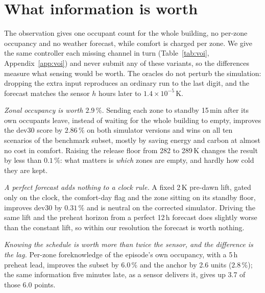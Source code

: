 \providecommand{\pending}[1]{\textcolor{red}{[pending: #1]}}
\providecommand{\e}[1]{\times10^{-#1}}

\section{What information is worth}
\label{sec:voi}

The observation gives one occupant count for the whole building, no per-zone occupancy and no
weather forecast, while comfort is charged per zone. We give the same controller each missing
channel in turn (Table~\ref{tab:voi}, Appendix~\ref{app:voi}) and never submit any of these
variants, so the differences measure what sensing would be worth. The oracles do not perturb
the simulation: dropping the extra input reproduces an ordinary run to the last digit, and the
forecast matches the sensor $h$ hours later to $1.4\e{5}$\,K.

\emph{Zonal occupancy is worth $2.9\,\%$.} Sending each zone to standby 15\,min after its own
occupants leave, instead of waiting for the whole building to empty, improves the dev30 score by
$2.86\,\%$ on both simulator versions and wins on all ten scenarios of the benchmark subset,
mostly by saving energy and carbon at almost no cost in comfort. Raising the release floor from
282 to 289\,K changes the result by less than $0.1\,\%$: what matters is \emph{which} zones are
empty, and hardly how cold they are kept.

\emph{A perfect forecast adds nothing to a clock rule.} A fixed 2\,K pre-dawn lift, gated only on
the clock, the comfort-day flag and the zone sitting on its standby floor, improves dev30 by
$0.31\,\%$ and is neutral on the corrected simulator. Driving the same lift and the preheat
horizon from a perfect 12\,h forecast does slightly worse than the constant lift, so within our
resolution the forecast is worth nothing.

\emph{Knowing the schedule is worth more than twice the sensor, and the difference is the lag.}
Per-zone foreknowledge of the episode's own occupancy, with a 5\,h preheat lead, improves the
subset by $6.0\,\%$ and the anchor by 2.6 units ($2.8\,\%$); the same information five minutes
late, as a sensor delivers it, gives up 3.7 of those 6.0 points.
